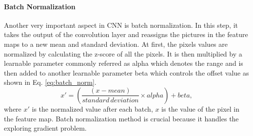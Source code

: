 \paragraph{Batch Normalization}
Another very important aspect in \ac{CNN} is batch normalization. In this step, it takes the output of the convolution layer and reassigns the pictures in the feature maps to a new mean and standard deviation. At first, the pixels values are normalized by calculating the z-score of all the pixels. It is then multiplied by a learnable parameter commonly referred as alpha which denotes the range and is then added to another learnable parameter beta which controls the offset value as shown in Eq. \ref{eq:batch_norm}. 
\begin{equation}
  \label{eq:batch_norm}
  x'= (\frac{(x-mean)}{standard \, deviation} \times alpha) + beta,
\end{equation}
where $x'$ is the normalized value after each batch, $x$ is the value of the pixel in the feature map. Batch normalization method is crucial because it handles the exploring gradient problem. 

